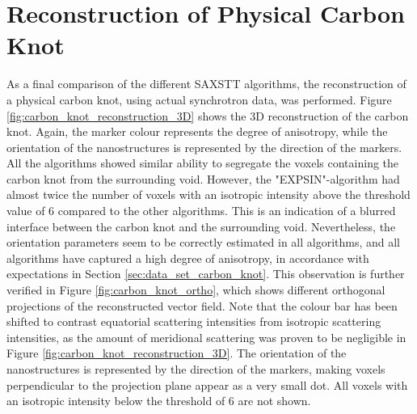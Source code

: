 \clearpage
\section{Reconstruction of Physical Carbon Knot}\label{sec:reconstruction_physical_carbon_knot}

As a final comparison of the different SAXSTT algorithms, the reconstruction of a physical carbon knot, using actual synchrotron data, was performed.
Figure \ref{fig:carbon_knot_reconstruction_3D} shows the 3D reconstruction of the carbon knot.
Again, the marker colour represents the degree of anisotropy, while the orientation of the nanostructures is represented by the direction of the markers.
All the algorithms showed similar ability to segregate the voxels containing the carbon knot from the surrounding void.
However, the "EXPSIN"-algorithm had almost twice the number of voxels with an isotropic intensity above the threshold value of 6 compared to the other algorithms.
This is an indication of a blurred interface between the carbon knot and the surrounding void.
Nevertheless, the orientation parameters seem to be correctly estimated in all algorithms,
and all algorithms have captured a high degree of anisotropy, in accordance with expectations in Section \ref{sec:data_set_carbon_knot}.
This observation is further verified in Figure \ref{fig:carbon_knot_ortho}, which shows different orthogonal projections of the reconstructed vector field.
Note that the colour bar has been shifted to contrast equatorial scattering intensities from isotropic scattering intensities,
as the amount of meridional scattering was proven to be negligible in Figure \ref{fig:carbon_knot_reconstruction_3D}.
The orientation of the nanostructures is represented by the direction of the markers, making voxels perpendicular to the projection plane appear as a very small dot.
All voxels with an isotropic intensity below the threshold of 6 are not shown.

\clearpage

